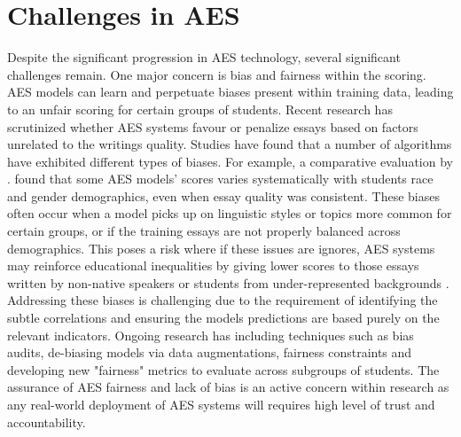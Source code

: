 \documentclass[10pt]{report}
\begin{document}
\section{Challenges in AES}
Despite the significant progression in AES technology, several significant challenges remain. One major concern is bias and fairness within the scoring. AES models can learn and perpetuate biases present within training data, leading to an unfair scoring for certain groups of students. Recent research has scrutinized whether AES systems favour or penalize essays based on factors unrelated 
to the writings quality. Studies have found that a number of algorithms have exhibited different types of biases. For example, a comparative evaluation by \parencite{litman2024fairness}. found that some AES models' scores varies systematically with students race and gender demographics, even when essay quality was consistent. These biases often occur when a model picks up on linguistic styles or topics 
more common for certain groups, or if the training essays are not properly balanced across demographics. This poses a risk where if these issues are ignores, AES systems may reinforce educational inequalities by giving lower scores to those essays written by non-native speakers or students from under-represented backgrounds \parencite{blodgett2020language}. Addressing these biases is challenging due to the requirement of identifying the subtle correlations and ensuring the models predictions are based purely on the relevant indicators. Ongoing research has including techniques such as bias audits, de-biasing models via data augmentations, fairness constraints and developing new "fairness" metrics to evaluate across subgroups of students. The assurance of AES fairness and lack of bias is an active concern within research as any real-world deployment of AES systems will requires high level of trust and accountability.
\end{document}
